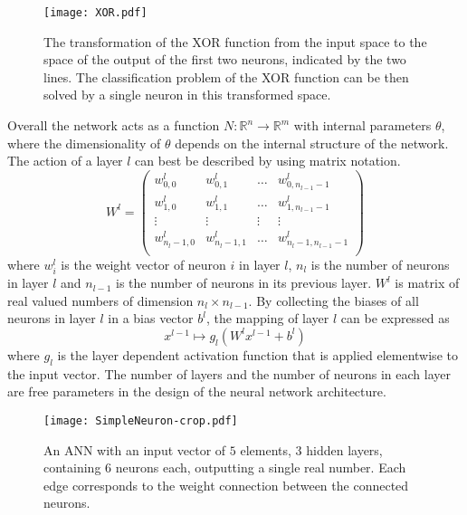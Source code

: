 \begin{figure}
\centering
\texttt{[image: XOR.pdf]}
\caption{The transformation of the XOR function from the input space to the space of the output of the first two neurons, indicated by the two lines. The classification problem of the XOR function can be then solved by a single neuron in this transformed space.}
\label{fig:XOR}
\end{figure}

%

Overall the network acts as a function $N: \mathbb{R}^n \rightarrow \mathbb{R}^m$ with internal parameters $\theta$, where the dimensionality of $\theta$ depends on the internal structure of the network. The action of a layer $l$ can best be described by using matrix notation. 
\begin{equation}
W^l = 
\begin{pmatrix}
w_{0,0}^l & w_{0,1}^l & \dots & w_{0,n_{l-1}-1}^l \\
w_{1,0}^l & w_{1,1}^l & \dots & w_{1,n_{l-1}-1}^l \\
\vdots & \vdots & \vdots & \vdots \\
w_{n_l-1,0}^l & w_{n_l-1,1}^l & \dots & w_{n_l-1,n_{l-1}-1}^l \\
\end{pmatrix}
\end{equation}
where $w_i^l$ is the weight vector of neuron $i$ in layer $l$, $n_l$ is the number of neurons in layer $l$ and $n_{l-1}$ is the number of neurons in its previous layer. $W^l$ is matrix of real valued numbers of dimension $n_l \times n_{l-1}$. By collecting the biases of all neurons in layer $l$ in a bias vector $b^l$, the mapping of layer $l$ can be expressed as%
\begin{equation}
x^{l-1} \mapsto g_l(W^l x^{l-1} + b^l)
\end{equation}
where $g_l$ is the layer dependent activation function that is applied elementwise to the input vector. The number of layers and the number of neurons in each layer are free parameters in the design of the neural network architecture. \\
\begin{figure}[H]
\centering
  \texttt{[image: SimpleNeuron-crop.pdf]}
  \caption{An ANN with an input vector of $5$ elements, $3$ hidden layers, containing $6$ neurons each, outputting a single real number. Each edge corresponds to the weight connection between the connected neurons. }
  \label{fig:ANN}
\end{figure}

